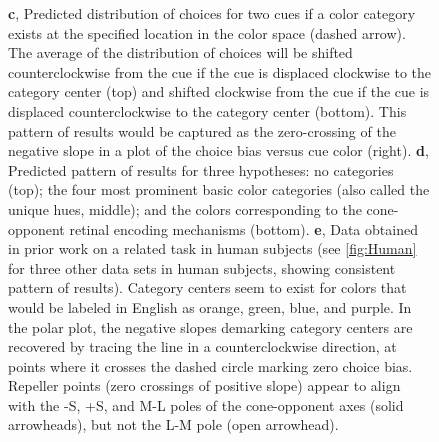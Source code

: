 \begin{figure}
\begin{fullwidth}
{	\textbf{c}, Predicted distribution of choices for two cues if a color category exists at the specified location in the color space (dashed arrow). 
	The average of the distribution of choices will be shifted counterclockwise from the cue if the cue is displaced clockwise to the category center (top) and shifted clockwise from the cue if the cue is displaced counterclockwise to the category center (bottom). This pattern of results would be captured as the zero-crossing of the negative slope in a plot of the choice bias versus cue color (right). 
	\textbf{d}, Predicted pattern of results for three hypotheses: no categories (top); the four most prominent basic color categories (also called the unique hues, middle); and the colors corresponding to the cone-opponent retinal encoding mechanisms (bottom). 
	\textbf{e}, Data obtained in prior work on a related task in human subjects (see \autoref{fig:Human} for three other data sets in human subjects, showing consistent pattern of results). 
    Category centers seem to exist for colors that would be labeled in English as orange, green, blue, and purple. 
	In the polar plot, the negative slopes demarking category centers are recovered by tracing the line in a counterclockwise direction, at points where it crosses the dashed circle marking zero choice bias.
    Repeller points (zero crossings of positive slope) appear to align with the -S, +S, and M-L poles of the cone-opponent axes (solid arrowheads), but not the L-M pole (open arrowhead).} 
    \label{fig:ParadigmAnalysisPredictions}
    \end{fullwidth}
\end{figure}

